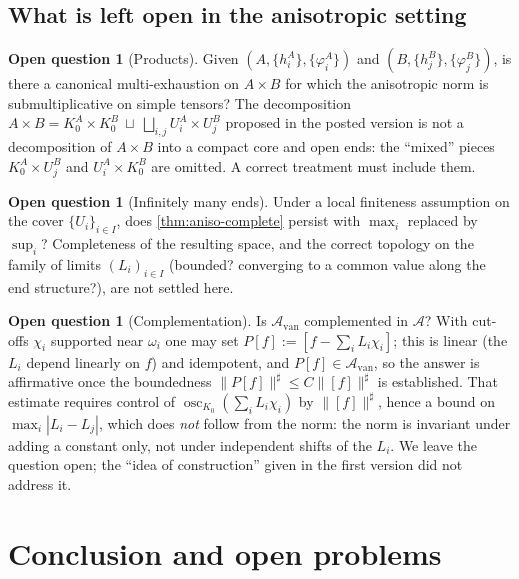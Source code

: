 \documentclass[11pt,a4paper]{article}
\numberwithin{equation}{section}
\theoremstyle{plain}
\theoremstyle{definition}
\newtheorem{question}[theorem]{Open question}
\theoremstyle{remark}
\DeclareMathOperator{\osc}{osc}
\begin{document}
\subsection{What is left open in the anisotropic setting}

\begin{question}[Products]\label{q:products}
Given $(A,\{h^A_i\},\{\varphi^A_i\})$ and $(B,\{h^B_j\},\{\varphi^B_j\})$, is there a
canonical multi-exhaustion on $A\times B$ for which the anisotropic norm is submultiplicative
on simple tensors? The decomposition $A\times B=K^A_0\times K^B_0\ \sqcup\ \bigsqcup_{i,j}
U^A_i\times U^B_j$ proposed in the posted version is not a decomposition of $A\times B$ into
a compact core and open ends: the ``mixed'' pieces $K^A_0\times U^B_j$ and
$U^A_i\times K^B_0$ are omitted. A correct treatment must include them.
\end{question}

\begin{question}[Infinitely many ends]\label{q:infinite-ends}
Under a local finiteness assumption on the cover $\{U_i\}_{i\in I}$, does
\cref{thm:aniso-complete} persist with $\max_i$ replaced by $\sup_i$? Completeness of the
resulting space, and the correct topology on the family of limits $(L_i)_{i\in I}$
(bounded? converging to a common value along the end structure?), are not settled here.
\end{question}

\begin{question}[Complementation]\label{q:projection}
Is $\mathcal{A}_{\mathrm{van}}$ complemented in $\mathcal{A}$? With cut-offs $\chi_i$
supported near $\omega_i$ one may set $P[f]:=[f-\sum_iL_i\chi_i]$; this is linear
(the $L_i$ depend linearly on $f$) and idempotent, and $P[f]\in\mathcal{A}_{\mathrm{van}}$,
so the answer is affirmative once the boundedness $\|P[f]\|^{\sharp}\le C\|[f]\|^{\sharp}$
is established. That estimate requires control of $\osc_{K_0}(\sum_iL_i\chi_i)$ by
$\|[f]\|^{\sharp}$, hence a bound on $\max_i|L_i-L_j|$, which does \emph{not} follow from
the norm: the norm is invariant under adding a constant only, not under independent shifts
of the $L_i$. We leave the question open; the ``idea of construction'' given in the first
version did not address it.
\end{question}

\section{Conclusion and open problems}
\label{sec:conclusion}
\end{document}
